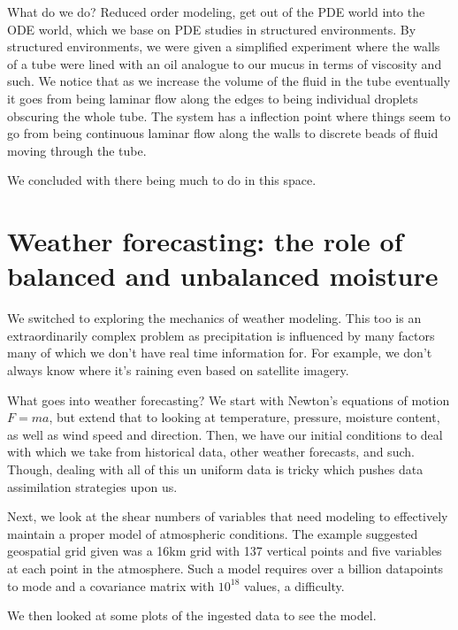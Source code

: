 \documentclass[12pt]{amsart}
\theoremstyle{definition}
\theoremstyle{question}
\begin{document}
\begin{onehalfspace}
        What do we do?
        Reduced order modeling, get out of the PDE world into the ODE world, which we base on PDE studies in structured
        environments.
        By structured environments, we were given a simplified experiment where the walls of a tube were lined with an
        oil analogue to our mucus in terms of viscosity and such.
        We notice that as we increase the volume of the fluid in the tube eventually it goes from being laminar flow
        along the edges to being individual droplets obscuring the whole tube.
        The system has a inflection point where things seem to go from being continuous laminar flow  along the walls to discrete beads
        of fluid moving through the tube.

        We concluded with there being much to do in this space.

        \section{Weather forecasting: the role of balanced and unbalanced moisture}
        We switched to exploring the mechanics of weather modeling.
        This too is an extraordinarily complex problem as precipitation is influenced by many factors many of which
        we don't have real time information for.
        For example, we don't always know where it's raining even based on satellite imagery.

        What goes into weather forecasting?
        We start with Newton's equations of motion $F=ma$, but extend that to looking at temperature, pressure, moisture
        content, as well as wind speed and direction.
        Then, we have our initial conditions to deal with which we take from historical data, other weather forecasts,
        and such.
        Though, dealing with all of this un uniform data is tricky which pushes data assimilation strategies upon us.

        Next, we look at the shear numbers of variables that need modeling to effectively maintain a proper model
        of atmospheric conditions.
        The example suggested geospatial grid given was a 16km grid with 137 vertical points and five variables at each
        point in the atmosphere.
        Such a model requires over a billion datapoints to mode and a covariance matrix with $10^{18}$ values, a difficulty.

        We then looked at some plots of the ingested data to see the model.




    \end{onehalfspace}
\end{document}
